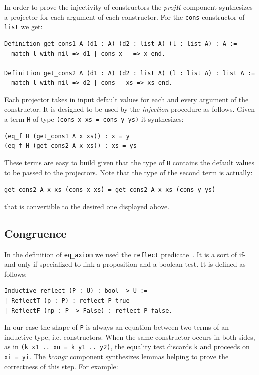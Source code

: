 \documentclass[a4paper,UKenglish,cleveref, autoref]{lipics-v2019}
\newcommand{\derive}[1]{\emph{#1}}
\begin{document}
In order to prove the injectivity of constructors the \derive{projK}
component synthesizes a projector for each argument of each constructor.
For the \lstinline+cons+ constructor of \lstinline+list+ we get:

\begin{lstlisting}
Definition get_cons1 A (d1 : A) (d2 : list A) (l : list A) : A :=
  match l with nil => d1 | cons x _ => x end.

Definition get_cons2 A (d1 : A) (d2 : list A) (l : list A) : list A :=
  match l with nil => d2 | cons _ xs => xs end.
\end{lstlisting}

\noindent
Each projector takes in input default values for each and every
argument of the constructor. It is designed to be used by the
\derive{injection} procedure as follows. Given a term
\lstinline+H+ of type \lstinline+(cons x xs = cons y ys)+
it synthesizes:

\begin{lstlisting}
(eq_f H (get_cons1 A x xs)) : x = y
(eq_f H (get_cons2 A x xs)) : xs = ys
\end{lstlisting}

\noindent
These terms are easy to build given that the type of \lstinline+H+
contains the default values to be passed to the projectors.
Note that the type of the second term is actually:

\begin{lstlisting}
get_cons2 A x xs (cons x xs) = get_cons2 A x xs (cons y ys)
\end{lstlisting}

\noindent
that is convertible to the desired one displayed above.

\subsection{Congruence} %
\label{sec:reflect}

In the definition of \lstinline+eq_axiom+ we used the \lstinline+reflect+
predicate~\cite{mcb}. It is a sort of if-and-only-if specialized to link a
proposition and a boolean test. It is defined as follows:

\begin{lstlisting}
Inductive reflect (P : U) : bool -> U :=
| ReflectT (p : P) : reflect P true
| ReflectF (np : P -> False) : reflect P false.
\end{lstlisting}

\noindent
In our case the shape of
\lstinline+P+ is always an equation between two terms of
an inductive type, i.e. constructors.
When the same constructor occurs in both sides, as in
\lstinline+(k x1 .. xn = k y1 .. y2)+, the equality test
discards \lstinline+k+ and proceeds on \lstinline+xi = yi+.
The \derive{bcongr} component synthesizes lemmas
helping to prove the correctness of this step. For example:
\end{document}
